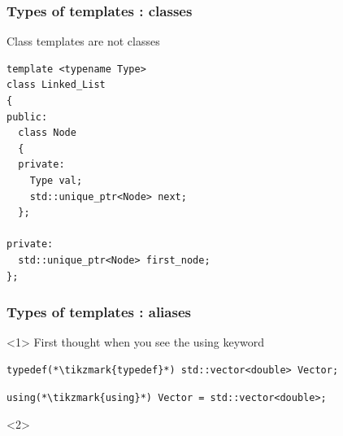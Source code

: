\documentclass[14pt]{beamer}
\begin{document}
\begin{frame}[fragile]
  \frametitle{Types of templates : classes}

  Class templates are not classes

  \vspace{.4cm}

  \begin{lstlisting}[basicstyle=\codefontsize{10pt}]
template <typename Type>
class Linked_List
{
public:
  class Node
  {
  private:
    Type val;
    std::unique_ptr<Node> next;
  };

private:
  std::unique_ptr<Node> first_node;
};
  \end{lstlisting}

\end{frame}

\begin{frame}[fragile]
  \frametitle{Types of templates : aliases}

  \begin{onlyenv}<1>
      First thought when you see the {\color{sblue}using} keyword
    
      \vspace{.5cm}
    
      \begin{lstlisting}[basicstyle=\codefontsize{12pt}]
typedef(*\tikzmark{typedef}*) std::vector<double> Vector;
      \end{lstlisting}
    
      \vspace{.75cm}
    
      \begin{lstlisting}[basicstyle=\codefontsize{12pt}]
using(*\tikzmark{using}*) Vector = std::vector<double>;
      \end{lstlisting}
    
      \nointerlineskip
  \end{onlyenv}

  \begin{onlyenv}<2>


\end{onlyenv}
\end{frame}
\end{document}
